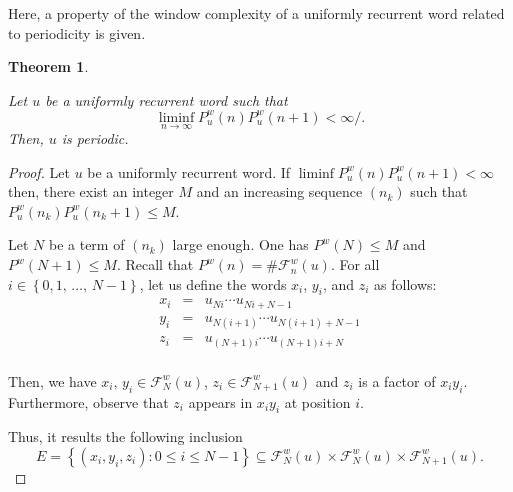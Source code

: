 \documentclass[a4 paper,12pt]{article}
\newtheorem{theorem}{Theorem}[section]
\begin{document}
Here, a property of the window complexity of a  uniformly recurrent word related to   periodicity is given.%
\begin{theorem} \label{liminf-fini=periodic}

Let $u$ be a uniformly recurrent word such that
 $$\liminf_{n\rightarrow \infty} P^{w}_{u}(n) P^{w}_{u}(n+1) <\infty/.$$
 Then,  $u$ is periodic.

\end{theorem}

\begin{proof}
Let $u$ be a uniformly recurrent word. If $\liminf P^{w}_{u}(n) P^{w}_{u}(n+1) <\infty$ then,  there exist an integer $M$ and an  increasing sequence $(n_k)$ such that $ P^{w}_{u}(n_{k}) P^{w}_{u}(n_{k}+1) \leq M$. %




Let  $N$ be a term of   $(n_k)$ large enough. One has $P^w(N)\leq M$ and $P^w(N+1)\leq M$. Recall that  $P^w(n)=\#\mathcal{F}^{w}_{n}(u)$. For all $i\in \left\{0,1, \, \ldots, \, N-1\right\}$, let us define the words $x_i$, $y_i$, and $z_i$ as follows:
$$\begin{array}{lcl}

x_i&=&u_{Ni}\cdots u_{Ni+N-1}\\
y_i&=&u_{N\left(i+1\right)}\cdots u_{N\left(i+1\right)+N-1}\\
z_i&=&u_{\left(N+1\right)i}\cdots u_{\left(N+1\right)i+N}\\

\end{array}$$

Then, we have $ x_i,\, y_i\in \mathcal{F}^{w}_{N}\left(u\right)$, $ z_i\in \mathcal{F}^{w}_{N+1}\left(u\right) $ and $z_i$ is a factor of $x_iy_i$. Furthermore, observe that $z_i$ appears in $x_iy_i$ at position $i$.


Thus, it results the following inclusion
$$E=\left\lbrace\left(x_i,y_i, z_i\right):  0\leq i\leq N-1\right\rbrace \subseteq\mathcal{F}_{N}^{w}(u)\times \mathcal{F}_{N}^{w}(u)\times \mathcal{F}_{N+1}^{w}(u).$$



\end{proof}
\end{document}
